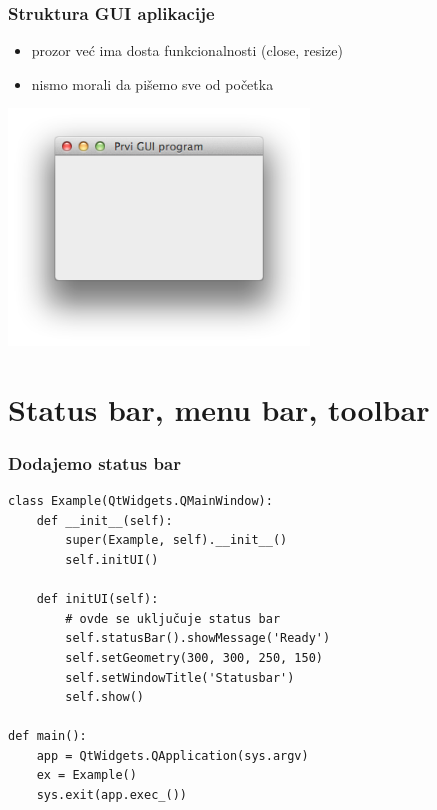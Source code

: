 \documentclass[utf8,compress]{beamer}
\begin{document}
\begin{frame}[fragile]
  \frametitle{Struktura GUI aplikacije}
  \begin{itemize}
    \item prozor već ima dosta funkcionalnosti (close, resize)
    \item nismo morali da pišemo sve od početka
  \end{itemize}
  \begin{center}
    \includegraphics[width=8cm]{pyqt01.png}
  \end{center}
\end{frame}

\section[Bars]{Status bar, menu bar, toolbar}

\begin{frame}[fragile]
  \frametitle{Dodajemo status bar}
\begin{verbatim}
class Example(QtWidgets.QMainWindow):
    def __init__(self):
        super(Example, self).__init__()
        self.initUI()
        
    def initUI(self):               
        # ovde se uključuje status bar
        self.statusBar().showMessage('Ready')
        self.setGeometry(300, 300, 250, 150)
        self.setWindowTitle('Statusbar')    
        self.show()

def main():    
    app = QtWidgets.QApplication(sys.argv)
    ex = Example()
    sys.exit(app.exec_())
\end{verbatim}
\end{frame}
\end{document}
